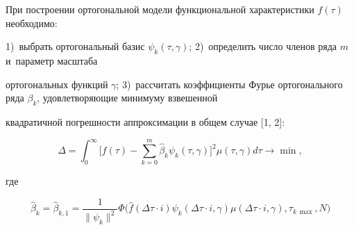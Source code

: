 








\date{14/VIII/2009} %









\maketitle



При построении ортогональной модели функциональной характеристики $f (\tau )$ необходимо:

1)~выбрать ортогональный базис $\psi _k  ( \tau, \gamma )$; 2)~определить число членов ряда $m$ и~параметр масштаба

ортогональных функций $\gamma $; 3)~рассчитать коэффициенты Фурье ортогонального ряда $\beta _k$, удовлетворяющие минимуму взвешенной

квадратичной погрешности аппроксимации в общем случае [1, 2]:

\begin{equation}

\label{prosha:eq1}

\Delta =\int_0^\infty  \biggl[ f (\tau) -\sum\limits_{k=0}^m \hat \beta  _k \psi _k  (\tau, \gamma )   \biggr]^2\mu  ( \tau , \gamma  )d\tau

 \to \min ,

\end{equation}

где

\begin{equation}

\label{prosha:eq2}

\hat \beta_k =\hat \beta_{k,1}

=\frac{1}{ \| \psi _k  \|^2} \Phi \bigl( \hat f  ( \Delta \tau \cdot i  ) \psi _k  ( \Delta \tau \cdot i, \gamma  ) \mu  (\Delta \tau \cdot i, \gamma), \tau _{k\,\max }, N  \bigr)

\end{equation}

